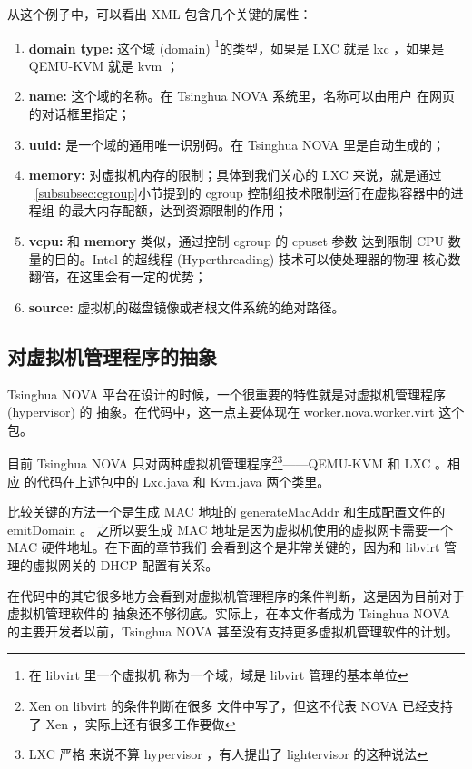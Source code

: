 从这个例子中，可以看出 XML 包含几个关键的属性：

\begin{enumerate}
    \item \textbf{domain type:} 这个域 (domain) \footnote{在 libvirt 里一个虚拟机
    称为一个域，域是 libvirt 管理的基本单位}的类型，如果是 LXC 就是 lxc ，如果是
    QEMU-KVM 就是 kvm ；
    \item \textbf{name:} 这个域的名称。在 Tsinghua NOVA 系统里，名称可以由用户
    在网页的对话框里指定；
    \item \textbf{uuid:} 是一个域的通用唯一识别码。在 Tsinghua NOVA 里是自动生成的；
    \item \textbf{memory:} 对虚拟机内存的限制；具体到我们关心的 LXC 来说，就是通过
    ~\ref{subsubsec:cgroup}小节提到的 cgroup 控制组技术限制运行在虚拟容器中的进程组
    的最大内存配额，达到资源限制的作用；
    \item \textbf{vcpu:} 和 \textbf{memory} 类似，通过控制 cgroup 的 cpuset 参数
    达到限制 CPU 数量的目的。Intel 的超线程 (Hyperthreading) 技术可以使处理器的物理
    核心数翻倍，在这里会有一定的优势；
    \item \textbf{source:} 虚拟机的磁盘镜像或者根文件系统的绝对路径。
\end{enumerate}

\subsection{对虚拟机管理程序的抽象}

Tsinghua NOVA 平台在设计的时候，一个很重要的特性就是对虚拟机管理程序 (hypervisor) 的
抽象。在代码中，这一点主要体现在 worker.nova.worker.virt 这个包。

目前 Tsinghua NOVA 只对两种虚拟机管理程序\footnote{Xen on libvirt 的条件判断在很多
文件中写了，但这不代表 NOVA 已经支持了 Xen ，实际上还有很多工作要做}\footnote{LXC 严格
来说不算 hypervisor ，有人提出了 lightervisor 的这种说法}——QEMU-KVM 和 LXC 。相应
的代码在上述包中的 Lxc.java 和 Kvm.java 两个类里。

比较关键的方法一个是生成 MAC 地址的 generateMacAddr 和生成配置文件的 emitDomain 。
之所以要生成 MAC 地址是因为虚拟机使用的虚拟网卡需要一个 MAC 硬件地址。在下面的章节我们
会看到这个是非常关键的，因为和 libvirt 管理的虚拟网关的 DHCP 配置有关系。

在代码中的其它很多地方会看到对虚拟机管理程序的条件判断，这是因为目前对于虚拟机管理软件的
抽象还不够彻底。实际上，在本文作者成为 Tsinghua NOVA 的主要开发者以前，Tsinghua NOVA
甚至没有支持更多虚拟机管理软件的计划。

